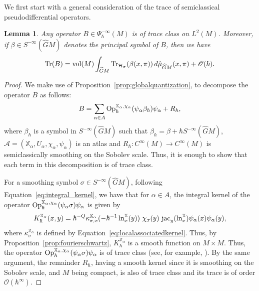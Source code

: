 \documentclass[12pt,a4paper]{amsart}
\theoremstyle{plain}
\newtheorem{lemma}[theorem]{Lemma}
\theoremstyle{definition}
\theoremstyle{remark}
\numberwithin{equation}{section}
\theoremstyle{definition}
\def \Op{{\rm Op}}
\def \jac {{\rm jac}}
\def \O{\mathscr{O}}
\def \bX{\mathbb{X}}
\def \Ghat{\widehat{G}}
\numberwithin{equation}{section}
\begin{document}
We first start with a general consideration of the trace of semiclassical pseudodifferential operators.

\begin{lemma}
    \label{lem:traceclass}
    Any operator $B\in \Psi_\hbar^{-\infty}(M)$ is of trace class on $L^2(M)$. Moreover, if $\beta\in S^{-\infty}(\Ghat M)$ denotes the principal symbol of $B$, then we have
    \begin{equation*}
        {\rm Tr}(B) = {\rm vol}(M)\int_{\Ghat M} {\rm Tr}_{\mathcal{H}_\pi}(\beta(x,\pi))\,d\hat{\mu}_{\Ghat M}(x,\pi) + \O(\hbar).
    \end{equation*}
\end{lemma}

\begin{proof}
We make use of Proposition~\ref{prop:globalquantization}, to decompose the operator $B$ as follows:
\begin{equation}
    \label{eq:decompositionquantization}
    B = \sum_{\alpha\in A} \Op_\hbar^{\bX_\alpha,\chi_\alpha}(\psi_\alpha \beta_\hbar)\psi_\alpha + R_\hbar,
\end{equation}
where $\beta_\hbar$ is a symbol in $S^{-\infty}(\Ghat M)$ such that $\beta_\hbar = \beta + \hbar S^{-\infty}(\Ghat M)$, $\mathcal{A} = (\bX_\alpha,U_\alpha,\chi_\alpha,\psi_\alpha)$ is an atlas and $R_\hbar: C^\infty(M)\rightarrow C^\infty(M)$ is semiclassically smoothing on the Sobolev scale. Thus, it is enough to show that each term in this decomposition is of trace class.

For a smoothing symbol $\sigma\in S^{-\infty}(\Ghat M)$, following Equation~\eqref{eq:integral_kernel}, we have that for $\alpha\in A$, the integral kernel of the operator $\Op_\hbar^{\bX_\alpha,\chi_\alpha}(\psi_\alpha \sigma)\psi_\alpha$ is given by 
\begin{equation*}
     K_\hbar^{\bX_\alpha}(x,y) = \hbar^{-Q} \kappa_{\sigma,x}^{\bX_\alpha} (- \hbar^{-1}  \ln^\bX_x (y)) \ \chi_x (y)\ \jac_{y} (\ln^\bX_x)\psi_\alpha(x)\psi_\alpha(y),
\end{equation*}
where $\kappa_\sigma^{\bX_\alpha}$ is defined by Equation~\eqref{eq:localassociatedkernel}.
Thus, by Proposition~\ref{prop:fourierschwartz}, $K_\hbar^{\bX_\alpha}$ is a smooth function on $M\times M$. Thus, the operator $\Op_\hbar^{\bX_\alpha,\chi_\alpha}(\psi_\alpha \sigma)\psi_\alpha$ is of trace class (see, for example, \cite[Theorem C.16]{Zwo}). By the same argument, the remainder $R_\hbar$, having a smooth kernel since it is smoothing on the Sobolev scale, and $M$ being compact, is also of trace class and its trace is of order $\O(\hbar^\infty)$.


\end{proof}
\end{document}
